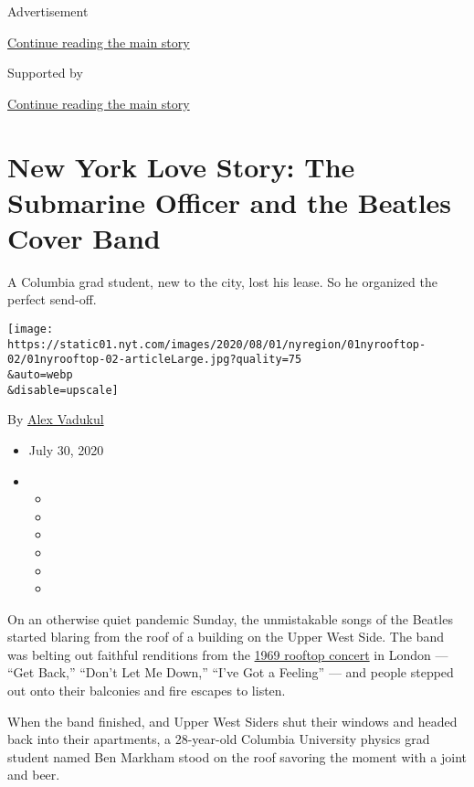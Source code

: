 Advertisement

\protect\hyperlink{after-top}{Continue reading the main story}

Supported by

\protect\hyperlink{after-sponsor}{Continue reading the main story}

\hypertarget{new-york-love-story-the-submarine-officer-and-the-beatles-cover-band}{%
\section{New York Love Story: The Submarine Officer and the Beatles
Cover
Band}\label{new-york-love-story-the-submarine-officer-and-the-beatles-cover-band}}

A Columbia grad student, new to the city, lost his lease. So he
organized the perfect send-off.

\texttt{[image: https://static01.nyt.com/images/2020/08/01/nyregion/01nyrooftop-02/01nyrooftop-02-articleLarge.jpg?quality=75\\\&auto=webp\\\&disable=upscale]}

By \href{https://www.nytimes.com/by/alex-vadukul}{Alex Vadukul}

\begin{itemize}
\item
  July 30, 2020
\item
  \begin{itemize}
  \item
  \item
  \item
  \item
  \item
  \item
  \end{itemize}
\end{itemize}

On an otherwise quiet pandemic Sunday, the unmistakable songs of the
Beatles started blaring from the roof of a building on the Upper West
Side. The band was belting out faithful renditions from the
\href{https://www.rollingstone.com/music/music-news/beatles-famous-rooftop-concert-15-things-you-didnt-know-58342/}{1969
rooftop concert} in London --- ``Get Back,'' ``Don't Let Me Down,''
``I've Got a Feeling'' --- and people stepped out onto their balconies
and fire escapes to listen.

When the band finished, and Upper West Siders shut their windows and
headed back into their apartments, a 28-year-old Columbia University
physics grad student named Ben Markham stood on the roof savoring the
moment with a joint and beer.

